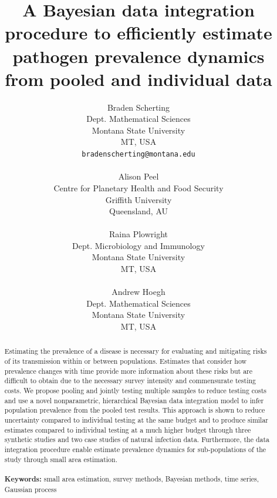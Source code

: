 \documentclass{article}
\title{A Bayesian data integration procedure to efficiently estimate pathogen prevalence dynamics from pooled and individual data}
\author{
  Braden Scherting \\
  Dept. Mathematical Sciences \\
  Montana State University \\
  MT, USA \\
  \texttt{bradenscherting@montana.edu} \\
\\
  Alison Peel \\
  Centre for Planetary Health and Food Security \\
  Griffith University \\
  Queensland, AU\\
\\
  Raina Plowright \\
  Dept. Microbiology and Immunology \\
  Montana State University \\
  MT, USA\\
\\
  Andrew Hoegh \\
  Dept. Mathematical Sciences \\
  Montana State University \\
  MT, USA \\}
\begin{document}
\maketitle


\begin{abstract}
Estimating the prevalence of a disease is necessary for evaluating and mitigating risks of its transmission within or between populations. Estimates that consider how prevalence changes with time provide more information about these risks but are difficult to obtain due to the necessary survey intensity and commensurate testing costs. We propose pooling and jointly testing multiple samples to reduce testing costs and use a novel nonparametric, hierarchical Bayesian data integration model to infer population prevalence from the pooled test results. This approach is shown to reduce uncertainty compared to individual testing at the same budget and to produce similar estimates compared to individual testing at a much higher budget through three synthetic studies and two case studies of natural infection data. Furthermore, the data integration procedure enable estimate prevalence dynamics for sub-populations of the study through small area estimation.\\
\\
{\bf Keywords:} small area estimation, survey methods, Bayesian methods, time series, Gaussian process
\end{abstract}


\end{document}
